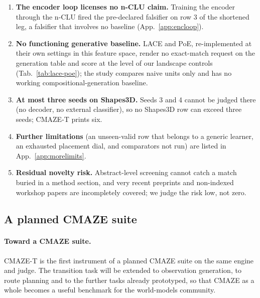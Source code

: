 \documentclass{article} %
\begin{document}
\begin{enumerate}
  learning rate and the longer epoch count of its grids, and the MLP at seed 0 still gains 1.47 tuples %
  per held-out combination from ten to thirty times its steps (Sec.~\ref{sec:shapes-t7}).
\item \textbf{The encoder loop licenses no n-CLU claim.} Training the encoder through the n-CLU
  fired the pre-declared falsifier on row 3 of the shortened leg, a falsifier that involves no baseline %
  (App.~\ref{app:encloop}).
\item \textbf{No functioning generative baseline.} LACE and PoE, re-implemented at their own settings
  in this feature space, render no exact-match request on the generation table and score at the level
  of our landscape controls (Tab.~\ref{tab:lace-poe}); the study compares naive units only and has no
  working compositional-generation baseline.
\item \textbf{At most three seeds on Shapes3D.} Seeds 3 and 4 cannot be judged there (no decoder, no
  external classifier), so no Shapes3D row can exceed three seeds; CMAZE-T prints six.
\item \textbf{Further limitations} (an unseen-valid row that belongs to a generic learner, an
  exhausted placement dial, and comparators not run) are listed in App.~\ref{app:morelimits}.
\item \textbf{Residual novelty risk.} Abstract-level screening cannot catch a match buried in a
  method section, and very recent preprints and non-indexed workshop papers are incompletely
  covered; we judge the risk low, not zero. %
\end{enumerate}

\subsection{A planned CMAZE suite}

\paragraph{Toward a CMAZE suite.} CMAZE-T is the first instrument of a planned CMAZE suite on the same
engine and judge. The transition task will be extended to observation generation, to route planning
and to the further tasks already prototyped, so that CMAZE as a whole becomes a useful benchmark for
the world-models community.
\end{document}
